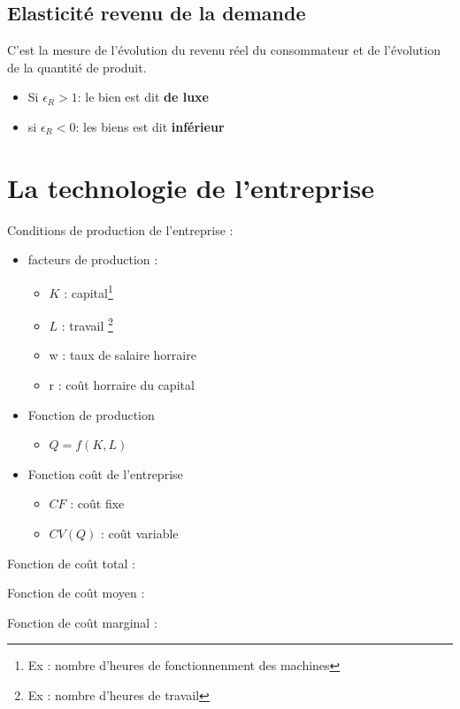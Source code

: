 \subsection{Elasticité revenu de la demande}
C'est la mesure de l'évolution du revenu réel du consommateur et de l'évolution de la quantité de produit.
\begin{center}
    \huge{}
\end{center}
\begin{itemize}
    \item Si $\epsilon_{R} > 1 $: le bien est dit \textbf{de luxe}
    \item si $\epsilon_{R} < 0 $: les biens est dit \textbf{inférieur}
\end{itemize}
\newpage
\section{La technologie de l'entreprise}
Conditions de production de l'entreprise :
\begin{itemize}
\item facteurs de production : 
    \begin{itemize}
        \item $K$ : capital\footnote{Ex : nombre d'heures de fonctionnenment des machines}
        \item $L$ : travail \footnote{Ex : nombre d'heures de travail}
        \item w : taux de salaire horraire
        \item r : coût horraire du capital
    \end{itemize}
\item Fonction de production
    \begin{itemize}
        \item $Q = f(K,L)$
    \end{itemize}
\item Fonction coût de l'entreprise
    \begin{itemize}
        \item $CF$ : coût fixe
        \item $CV(Q)$ : coût variable
    \end{itemize}
\end{itemize}
Fonction de coût total :
\begin{center}
    \Large{}
\end{center}
Fonction de coût moyen :
\begin{center}
    \Large{}
\end{center}
Fonction de coût marginal :
\begin{center}
    \Large{}
\end{center}
\newpage
